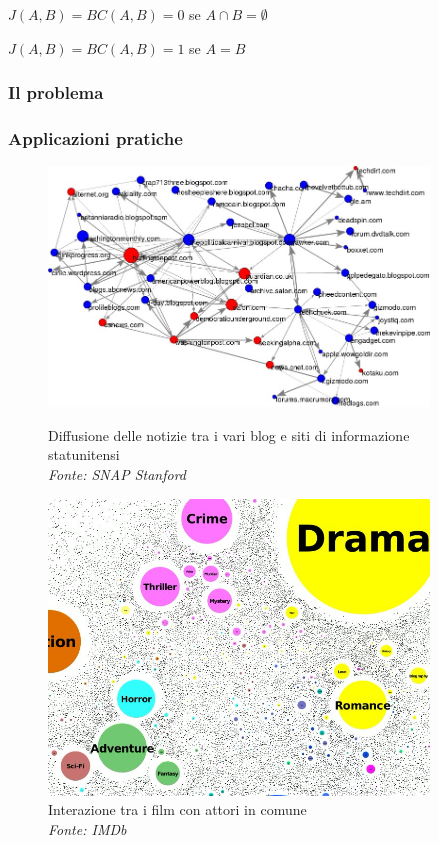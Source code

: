 \begin{frame}
\begin{figure}[h]
\begin{minipage}[t]{.48\textwidth}
		\end{minipage}\hfill		
	\end{figure}
	\small
	$J(A,B) = BC(A,B) = 0$ se $A \cap B = \emptyset$\medskip
	
	$J(A,B) = BC(A,B) = 1$ se $A = B$ \phantom{$\cap \emptyset.$}
	
\end{frame}

\begin{frame}
	\frametitle{Il problema}
	\centering
\end{frame}

\begin{frame}
	\frametitle{Applicazioni pratiche}
	\centering
	\begin{figure}[h]
		\centering
		\begin{minipage}[t]{.49\textwidth}
			\centering
			\includegraphics[width=0.9\textwidth]{images/4_netinf}
			\caption{Diffusione delle notizie tra i vari blog e siti di informazione statunitensi\\ \textit{Fonte: SNAP Stanford}}
		\end{minipage}\hfill
		\begin{minipage}[t]{.49\textwidth}
			\centering
			\includegraphics[width=0.9\textwidth]{images/6_imdb}
			\caption{Interazione tra i film con attori in comune\\ \textit{Fonte: IMDb}}
		\end{minipage}
	\end{figure}
\end{frame}
